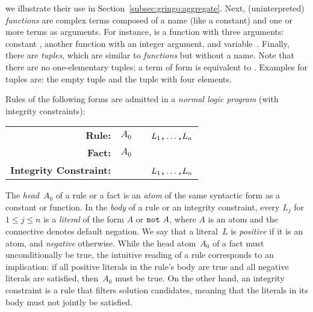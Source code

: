 we illustrate their use in Section~\ref{subsec:gringo:aggregate}.
Next, (uninterpreted) \emph{functions} are complex terms composed of a name (like a constant)
and one or more terms as arguments. %
For instance, 
is a function with three arguments:
constant , another function 
with an integer argument, and variable~.
Finally, there are \emph{tuples}, which are similar to \emph{functions} but without a name.
Note that there are no one-elementary tuples; a term of form  is equivalent to .
Examples for tuples are:
the empty tuple \code{()} and 
the tuple  with four elements.

Rules of the following forms are admitted in a 
\emph{normal logic program} (with integrity constraints):
\par
\medskip
\begin{tabular}{rl@{}l}\label{eq:normal:rule}
\textbf{Rule:} & $A_0$&~\code{:-}~$L_1\text{\texttt{,}}\dots\text{\texttt{,}}L_n$\code{.}
\\
\textbf{Fact:} & $A_0$&\code{.}
\\
\textbf{Integrity Constraint:} & &~\code{:-}~$L_1\texttt{,}\dots\texttt{,}L_n$\code{.}
\end{tabular}
%
%
%
\par
\medskip
\noindent
The \emph{head}~$A_0$ of a rule or a fact is an \emph{atom} of the same 
syntactic form as a constant or function.
%
In the \emph{body} of a rule or an integrity constraint,
every $L_j$ for $1\leq j\leq n$ is a \emph{literal} of the form $A$ or $\texttt{not}~A$,
where $A$ is an atom and
the connective  denotes default negation.
%
%
We say that a literal~$L$ is \emph{positive} if it is an atom,
and \emph{negative} otherwise.
While the head atom~$A_0$ of a fact must unconditionally be true,
the intuitive reading of a rule corresponds to an implication:
if all positive literals in the rule's body are true and all negative
literals are satisfied, then~$A_0$ must be true.
On the other hand, an integrity constraint is a rule that filters solution candidates,
meaning that the literals in its body must not jointly be satisfied.

